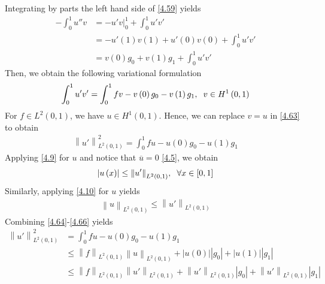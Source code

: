 \documentclass[a4paper]{article}
\numberwithin{equation}{section}
\begin{document}
Integrating by parts the left hand side of \eqref{4.59} yields
\begin{align}
 - \int_0^1 {u''v}  &=  - \left. {u'v} \right|_0^1 + \int_0^1 {u'v'} \\
& =  - u'\left( 1 \right)v\left( 1 \right) + u'\left( 0 \right)v\left( 0 \right) + \int_0^1 {u'v'} \\
& = v\left( 0 \right){g_0} + v\left( 1 \right){g_1} + \int_0^1 {u'v'} 
\end{align}
Then, we obtain the following variational formulation
\begin{align}
\label{4.63}
\int_0^1 {u'v'}  = \int_0^1 {fv}  - v\left( 0 \right){g_0} - v\left( 1 \right){g_1},\hspace{0.2cm} v \in {H^1}\left( {0,1} \right)
\end{align}
For $f\in L^2\left(0,1\right)$, we have $u\in H^1\left(0,1\right)$. Hence, we can replace $v=u$ in \eqref{4.63} to obtain
\begin{align}
\label{4.64}
\left\| {u'} \right\|_{{L^2}\left( {0,1} \right)}^2 = \int_0^1 {fu}  - u\left( 0 \right){g_0} - u\left( 1 \right){g_1}
\end{align}
Applying \eqref{4.9} for $u$ and notice that $\overline{u}=0$ \eqref{4.5}, we obtain
\begin{align}
\label{4.65}
\left| {u\left( x \right)} \right| \le {\left\| {u'} \right\|_{{L^2}\left( {0,1} \right)}},\hspace{0.2cm}\forall x \in \left[ {0,1} \right]
\end{align}
Similarly, applying \eqref{4.10} for $u$ yields
\begin{align}
\label{4.66}
{\left\| u \right\|_{{L^2}\left( {0,1} \right)}} \le {\left\| {u'} \right\|_{{L^2}\left( {0,1} \right)}}
\end{align}
Combining \eqref{4.64}-\eqref{4.66} yields
\begin{align}
\label{4.67}
\left\| {u'} \right\|_{{L^2}\left( {0,1} \right)}^2 &= \int_0^1 {fu}  - u\left( 0 \right){g_0} - u\left( 1 \right){g_1}\\
& \le {\left\| f \right\|_{{L^2}\left( {0,1} \right)}}{\left\| u \right\|_{{L^2}\left( {0,1} \right)}} + \left| {u\left( 0 \right)} \right|\left| {{g_0}} \right| + \left| {u\left( 1 \right)} \right|\left| {{g_1}} \right|\label{4.68}\\
& \le {\left\| f \right\|_{{L^2}\left( {0,1} \right)}}{\left\| {u'} \right\|_{{L^2}\left( {0,1} \right)}} + {\left\| {u'} \right\|_{{L^2}\left( {0,1} \right)}}\left| {{g_0}} \right| + {\left\| {u'} \right\|_{{L^2}\left( {0,1} \right)}}\left| {{g_1}} \right| \label{4.69}
\end{align}
\end{document}
